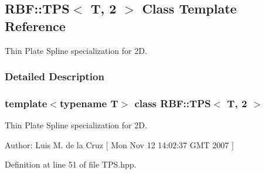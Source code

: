 \hypertarget{classRBF_1_1TPS_3_01T_00_012_01_4}{
\subsection{RBF::TPS$<$ T, 2 $>$ Class Template Reference}
\label{classRBF_1_1TPS_3_01T_00_012_01_4}
}
Thin Plate Spline specialization for 2D.  




\subsubsection{Detailed Description}
\subsubsection*{template$<$typename T$>$ class RBF::TPS$<$ T, 2 $>$}

Thin Plate Spline specialization for 2D. 

\begin{Desc}
\item[Author:]Luis M. de la Cruz \mbox{[} Mon Nov 12 14:02:37 GMT 2007 \mbox{]} \end{Desc}


Definition at line 51 of file TPS.hpp.